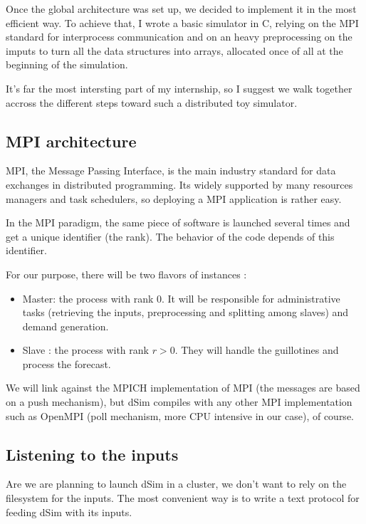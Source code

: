 \documentclass[11pt]{JHEP3}
\begin{document}
Once the global architecture was set up, we decided to implement it in the most efficient way. To achieve that, I wrote a basic simulator in C, relying on the MPI standard for interprocess communication and on an heavy preprocessing on the imputs to turn all the data structures into arrays, allocated once of all at the beginning of the simulation.

It's far the most intersting part of my internship, so I suggest we walk together accross the different steps toward such a distributed toy simulator.

\subsection{MPI architecture}

MPI, the Message Passing Interface, is the main industry standard for data exchanges in distributed programming. Its widely supported by many resources managers and task schedulers, so deploying a MPI application is rather easy.

In the MPI paradigm, the same piece of software is launched several times and get a unique identifier (the rank). The behavior of the code depends of this identifier. 

For our purpose, there will be two flavors of instances :

\begin{itemize}
\item Master: the process with rank 0. It will be responsible for administrative tasks (retrieving the inputs, preprocessing and splitting among slaves) and demand generation. 
\item Slave : the process with rank $r > 0$. They will handle the guillotines and process the forecast. 
\end{itemize}

We will link against the MPICH implementation of MPI (the messages are based on a push mechanism), but dSim compiles with any other MPI implementation such as OpenMPI (poll mechanism, more CPU intensive in our case), of course.

\subsection{Listening to the inputs}

Are we are planning to launch dSim in a cluster, we don't want to rely on the filesystem for the inputs. The most convenient way is to write a text protocol for feeding dSim with its inputs. 
\end{document}
